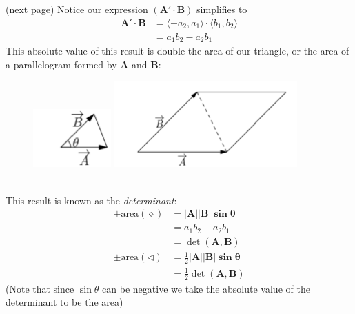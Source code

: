 \documentclass{report}
\begin{document}
(next page)
\newpage
\noindent Notice our expression $(\mathbf{A'\cdot B})$ simplifies to
\begin{align*}
\mathbf{A'\cdot B}
&=\langle -a_2,a_1\rangle\cdot\langle b_1,b_2\rangle\\
&=a_1b_2-a_2b_1
\end{align*}
This absolute value of this result is double the area of our triangle, or the 
area of a parallelogram formed by $\mathbf{A}$ and $\mathbf{B}$:
\begin{figure}[h]
\includegraphics[width=3cm]{Capture70}
\includegraphics[width=7cm]{Capture73}\\
\centering
\end{figure}\\
This result is known as the \textit{determinant}:
\begin{align*}
\pm\text{area}(\diamond)&=\mathbf{|A||B|\sin\theta}\\
&=a_1b_2-a_2b_1\\
&=\det(\mathbf{A,B})\\
\pm\text{area}(\triangleleft)&=\frac{1}{2}\mathbf{|A||B|\sin\theta}\\
&=\frac{1}{2}\det(\mathbf{A,B})
\end{align*}
(Note that since $\sin\theta$ can be negative we take the absolute value of the
determinant to be the area)
\newpage
\end{document}
